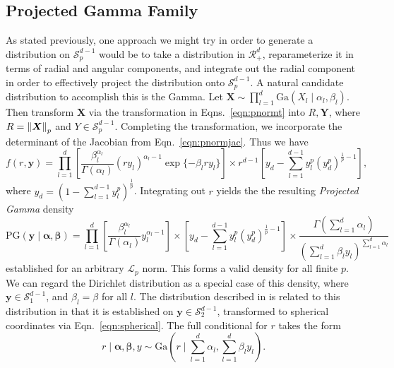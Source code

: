 \subsection{Projected Gamma Family}
As stated previously, one approach we might try in order to generate a distribution on
  $\mathcal{S}_{p}^{d-1}$ would be to take a distribution in $\mathcal{R}_{+}^d$, reparameterize
  it in terms of radial and angular components, and integrate out the radial component in order to
  effectively project the distribution onto $\mathcal{S}_{p}^{d-1}$.  A natural candidate distribution
  to accomplish this is the Gamma.  Let $\bm{ X} \sim \prod_{l = 1}^d\text{Ga}\left(X_l\mid\alpha_l,\beta_l\right)$.
  Then transform $\bm{ X}$ via the transformation in Eqns.~\ref{eqn:pnormt} into $R,\bm{ Y}$, where
  $R = \left\lVert \bm{ X} \right\rVert_{p}$ and $Y\in \mathcal{S}_{p}^{d-1}$.  Completing the transformation, we
  incorporate the determinant of the Jacobian from Eqn.~\ref{eqn:pnormjac}.  Thus we have
  \begin{equation}
    \label{eqn:protopg}
    f(r,\bm{ y}) = \prod_{l = 1}^{d}
      \left[\frac{\beta_l^{\alpha_l}}{\Gamma(\alpha_l)}(ry_l)^{\alpha_l - 1}\exp\lbrace-\beta_lry_l\rbrace\right]
      \times r^{d-1}\left[y_d - {\textstyle \sum}_{l = 1}^{d-1}y_l^p\left(y_d^p\right)^{\frac{1}{p} - 1}\right],
  \end{equation}
  where $y_d = \left(1 - \sum_{l=1}^{d-1}y_l^p\right)^{\frac{1}{p}}$. Integrating out $r$ yields the
  the resulting \emph{Projected Gamma} density
  \begin{equation}
    \label{eqn:projgamma}
    \text{PG}(\bm{ y}\mid\bm{ \alpha},\bm{ \beta}) = \prod_{l = 1}^d\left[\frac{\beta_l^{\alpha_l}}{\Gamma(\alpha_l)}y_l^{\alpha_l - 1}\right]
      \times \left[y_d - {\textstyle \sum}_{l = 1}^{d-1}y_l^p\left(y_d^p\right)^{\frac{1}{p} - 1}\right]
      \times \frac{\Gamma({\textstyle\sum}_{l = 1}^d\alpha_l)}{\left({\textstyle\sum}_{l = 1}^d \beta_ly_l\right)^{{\scriptstyle\sum_{l = 1}^d \alpha_l}}}
  \end{equation}
  established for an arbitrary $\mathcal{L}_p$ norm. This forms a valid density for all finite $p$.
  We can regard the Dirichlet distribution as a special case of this density, where
  $\bm{ y}\in \mathcal{S}_1^{d-1}$, and $\beta_l = \beta$ for all $l$.  The distribution described
  in \cite{nunez2019} is related to this distribution in that it is established on
  $\bm{ y}\in \mathcal{S}_2^{d-1}$, transformed to spherical coordinates via Eqn.~\ref{eqn:spherical}.
  The full conditional for $r$ takes the form
  \begin{equation}
    \label{eqn:rfullcond}
    r\mid\bm{ \alpha},\bm{ \beta}, y \sim \text{Ga}\left(r\mid{\textstyle\sum}_{l = 1}^d \alpha_l, {\textstyle\sum}_{l = 1}^d \beta_ly_l\right).
  \end{equation}

